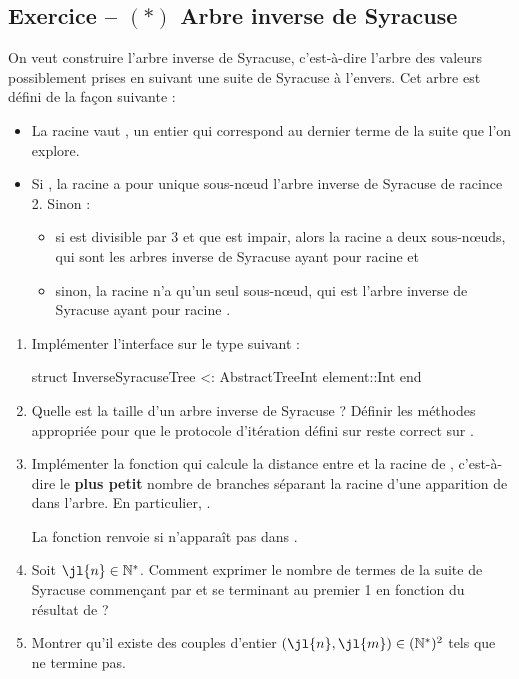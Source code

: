 \documentclass{article}
\newcounter{loop}
\newcounter{numEx}
\newcommand{\exo}[1]{
	\stepcounter{numEx}
	\setcounter{loop}{0}
	\subsection*{Exercice \arabic{numEx} -- #1}
}
\newenvironment{repl}{\vspace{-0.6em}\VerbatimEnvironment\begin{jlrepl}}{\end{jlrepl}}
\begin{document}
\exo{$(*)$ Arbre inverse de Syracuse}

On veut construire l'arbre inverse de Syracuse, c'est-à-dire l'arbre des valeurs possiblement prises en suivant une suite de Syracuse à l'envers. Cet arbre est défini de la façon suivante :
\begin{itemize}
	\item La racine vaut , un entier qui correspond au dernier terme de la suite que l'on explore.
	\item Si , la racine a pour unique sous-nœud l'arbre inverse de Syracuse de racince 2. Sinon :
	\begin{itemize}
		\item si  est divisible par 3 et que  est impair, alors la racine a deux sous-nœuds, qui sont les arbres inverse de Syracuse ayant pour racine  et 
		\item sinon, la racine n'a qu'un seul sous-nœud, qui est l'arbre inverse de Syracuse ayant pour racine .
	\end{itemize}
\end{itemize}

\begin{enumerate}
	\item Implémenter l'interface  sur le type suivant :
	\begin{repl}
		struct InverseSyracuseTree <: AbstractTree{Int}
			element::Int
		end
	\end{repl}
	
	\item Quelle est la taille d'un arbre inverse de Syracuse ? Définir les méthodes appropriée pour que le protocole d'itération défini sur  reste correct sur .

	\item Implémenter la fonction  qui calcule la distance entre  et la racine de , c'est-à-dire le \textbf{plus petit} nombre de branches séparant la racine d'une apparition de  dans l'arbre. En particulier, .
	
	La fonction renvoie  si  n'apparaît pas dans .

	\item Soit $\jl{n}\in\mathbb N^*$. Comment exprimer le nombre de termes de la suite de Syracuse commençant par  et se terminant au premier 1 en fonction du résultat de  ?
	
	\item Montrer qu'il existe des couples d'entier $(\jl{n},\jl{m})\in(\mathbb N^*)^2$ tels que  ne termine pas.
\end{enumerate}
\end{document}
